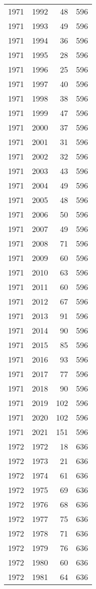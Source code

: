 \documentclass[
  11pt,
  letterpaper,
  DIV=11,
  numbers=noendperiod,
  twoside]{scrartcl}
\begin{document}
\begin{longtable}[]{@{}rrrr@{}}
1971 & 1992 & 48 & 596 \\
1971 & 1993 & 49 & 596 \\
1971 & 1994 & 36 & 596 \\
1971 & 1995 & 28 & 596 \\
1971 & 1996 & 25 & 596 \\
1971 & 1997 & 40 & 596 \\
1971 & 1998 & 38 & 596 \\
1971 & 1999 & 47 & 596 \\
1971 & 2000 & 37 & 596 \\
1971 & 2001 & 31 & 596 \\
1971 & 2002 & 32 & 596 \\
1971 & 2003 & 43 & 596 \\
1971 & 2004 & 49 & 596 \\
1971 & 2005 & 48 & 596 \\
1971 & 2006 & 50 & 596 \\
1971 & 2007 & 49 & 596 \\
1971 & 2008 & 71 & 596 \\
1971 & 2009 & 60 & 596 \\
1971 & 2010 & 63 & 596 \\
1971 & 2011 & 60 & 596 \\
1971 & 2012 & 67 & 596 \\
1971 & 2013 & 91 & 596 \\
1971 & 2014 & 90 & 596 \\
1971 & 2015 & 85 & 596 \\
1971 & 2016 & 93 & 596 \\
1971 & 2017 & 77 & 596 \\
1971 & 2018 & 90 & 596 \\
1971 & 2019 & 102 & 596 \\
1971 & 2020 & 102 & 596 \\
1971 & 2021 & 151 & 596 \\
1972 & 1972 & 18 & 636 \\
1972 & 1973 & 21 & 636 \\
1972 & 1974 & 61 & 636 \\
1972 & 1975 & 69 & 636 \\
1972 & 1976 & 68 & 636 \\
1972 & 1977 & 75 & 636 \\
1972 & 1978 & 71 & 636 \\
1972 & 1979 & 76 & 636 \\
1972 & 1980 & 60 & 636 \\
1972 & 1981 & 64 & 636 \\

\end{longtable}
\end{document}
